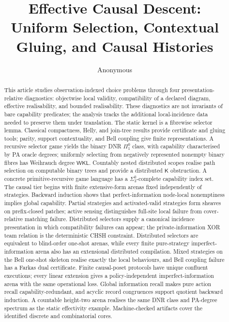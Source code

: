 \documentclass[11pt]{article}
\title{Effective Causal Descent:\\ Uniform Selection, Contextual Gluing, and Causal Histories}
\author{Anonymous}
\date{}
\theoremstyle{plain}
\theoremstyle{definition}
\theoremstyle{remark}
\begin{document}
\maketitle

\begin{abstract}
This article studies observation-indexed choice problems through four presentation-relative
diagnostics: objectwise local validity, compatibility of a declared diagram,
effective realisability, and bounded realisability. These diagnostics are not
invariants of bare capability predicates; the analysis tracks the additional
local-incidence data needed to preserve them under translation. The static kernel is a fibrewise selector lemma. Classical
compactness, Helly, and join-tree results provide certificate and gluing tools;
parity, support contextuality, and Bell coupling give finite representations. A
recursive selector game yields the binary DNR $\Pi^0_1$ class, with capability
characterised by PA oracle degrees; uniformly selecting from negatively
represented nonempty binary fibres has Weihrauch degree $\mathsf{WKL}$.
Countably nested distributed scopes realise path selection on computable binary
trees and provide a distributed $\mathsf K$ obstruction. A concrete
primitive-recursive game language has a $\Sigma^0_3$-complete capability index
set. The causal tier begins with finite extensive-form arenas fixed independently of
strategies. Backward induction shows that perfect-information node-local
nonemptiness implies global capability. Partial strategies and activated-valid
strategies form sheaves on prefix-closed patches; active sensing distinguishes
full-site local failure from cover-relative matching failure. Distributed
selectors supply a canonical incidence presentation in which compatibility
failures can appear; the private-information XOR team relation is the
deterministic CHSH constraint. Distributed selectors are
equivalent to blind-order one-shot arenas, while every finite pure-strategy
imperfect-information arena also has an extensional distributed compilation.
Mixed strategies on the Bell one-shot skeleton realise exactly the local
behaviours, and Bell coupling failure has a Farkas dual certificate. Finite
causal-poset protocols have unique confluent executions; every linear extension
gives a policy-independent imperfect-information arena with the same operational
loss. Global information recall makes pure action recall capability-redundant,
and acyclic record congruences support quotient backward induction. A countable
height-two arena realises the same DNR class and PA-degree spectrum as the static
effectivity example. Machine-checked artifacts cover the identified discrete and combinatorial
cores.

\end{abstract}
\end{document}
